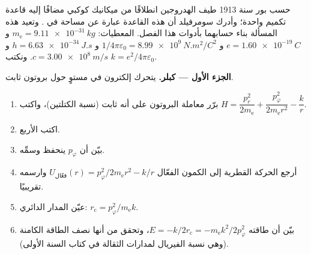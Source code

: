 \begin{problem}\label{pb:b3:hamiltonian-mechanics:1}
حسب بور سنة 1913 طيف الهدروجين انطلاقًا من ميكانيك كوكبي مضافًا
إليه قاعدة تكميم واحدة؛ وأدرك سومرفيلد أن هذه القاعدة عبارة عن
مساحة في . وتعيد هذه المسألة بناء حسابهما بأدوات هذا
الفصل. المعطيات: $m_{\text{e}} =
\qty{9.11e-31}{kg}$ و $e = \qty{1.60e-19}{C}$ و $1/4\pi\varepsilon_0 =
\qty{8.99e9}{N.m^2/C^2}$ و $h = \qty{6.63e-34}{J.s}$ و $c =
\qty{3.00e8}{m/s}$. ونكتب $k = e^2/4\pi\varepsilon_0$.

\medskip\noindent\textbf{الجزء الأول ---  كبلر.}
يتحرك إلكترون في مستوٍ حول بروتون ثابت.
\begin{enumerate}
  \item برّر معاملة البروتون على أنه ثابت (نسبة الكتلتين)، واكتب
         $H = \dfrac{p_r^2}{2m_{\text{e}}} +
        \dfrac{p_\varphi^2}{2m_{\text{e}}r^2} - \dfrac{k}{r}$.
  \item اكتب  الأربع.
  \item بيّن أن $p_\varphi$ ينحفظ وسمِّه.
  \item أرجع الحركة القطرية إلى الكمون الفعّال
        $U_{\text{فعّال}}(r) = p_\varphi^2/2m_{\text{e}}r^2 - k/r$ وارسمه
        تقريبيًا.
  \item عيّن المدار الدائري: $r_{\text{c}} =
        p_\varphi^2/m_{\text{e}}k$.
  \item بيّن أن طاقته $E = -k/2r_{\text{c}} =
        -m_{\text{e}}k^2/2p_\varphi^2$، وتحقق من أنها نصف الطاقة
        الكامنة (وهي نسبة الفيريال لمدارات الثقالة في كتاب السنة
        الأولى).
\end{enumerate}


\end{problem}
